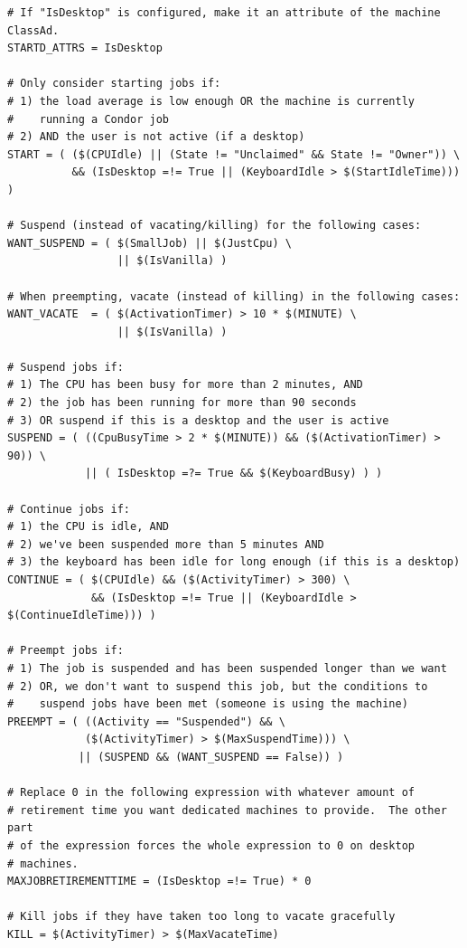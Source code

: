 \begin{verbatim}
# If "IsDesktop" is configured, make it an attribute of the machine ClassAd.
STARTD_ATTRS = IsDesktop

# Only consider starting jobs if:
# 1) the load average is low enough OR the machine is currently
#    running a Condor job
# 2) AND the user is not active (if a desktop)
START = ( ($(CPUIdle) || (State != "Unclaimed" && State != "Owner")) \
          && (IsDesktop =!= True || (KeyboardIdle > $(StartIdleTime))) )

# Suspend (instead of vacating/killing) for the following cases:
WANT_SUSPEND = ( $(SmallJob) || $(JustCpu) \
                 || $(IsVanilla) )

# When preempting, vacate (instead of killing) in the following cases:
WANT_VACATE  = ( $(ActivationTimer) > 10 * $(MINUTE) \
                 || $(IsVanilla) )

# Suspend jobs if:
# 1) The CPU has been busy for more than 2 minutes, AND
# 2) the job has been running for more than 90 seconds
# 3) OR suspend if this is a desktop and the user is active
SUSPEND = ( ((CpuBusyTime > 2 * $(MINUTE)) && ($(ActivationTimer) > 90)) \
            || ( IsDesktop =?= True && $(KeyboardBusy) ) )

# Continue jobs if:
# 1) the CPU is idle, AND 
# 2) we've been suspended more than 5 minutes AND
# 3) the keyboard has been idle for long enough (if this is a desktop)
CONTINUE = ( $(CPUIdle) && ($(ActivityTimer) > 300) \
             && (IsDesktop =!= True || (KeyboardIdle > $(ContinueIdleTime))) )

# Preempt jobs if:
# 1) The job is suspended and has been suspended longer than we want
# 2) OR, we don't want to suspend this job, but the conditions to
#    suspend jobs have been met (someone is using the machine)
PREEMPT = ( ((Activity == "Suspended") && \
            ($(ActivityTimer) > $(MaxSuspendTime))) \
           || (SUSPEND && (WANT_SUSPEND == False)) )

# Replace 0 in the following expression with whatever amount of
# retirement time you want dedicated machines to provide.  The other part
# of the expression forces the whole expression to 0 on desktop
# machines.
MAXJOBRETIREMENTTIME = (IsDesktop =!= True) * 0

# Kill jobs if they have taken too long to vacate gracefully
KILL = $(ActivityTimer) > $(MaxVacateTime) 

\end{verbatim}

